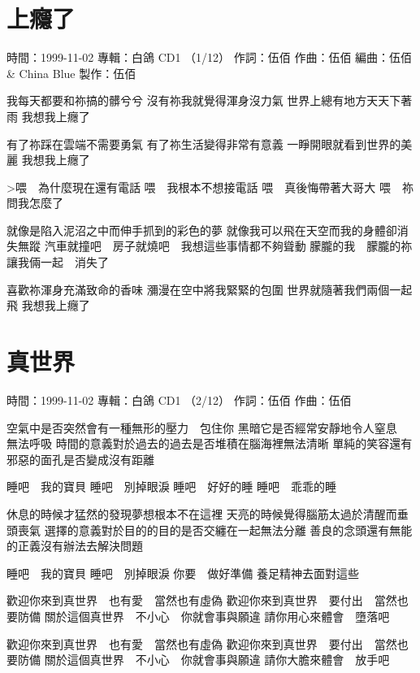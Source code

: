 \documentclass[UTF8,a4paper,oneside,twocolumn,12pt]{ctexbook}
\newcommand{\infopair}[2]{\textbullet #1：#2}
\newcommand{\zc}[1][伍佰]{\infopair{作詞}{#1}}
\newcommand{\zq}[1][伍佰]{\infopair{作曲}{#1}}
\newcommand{\bq}[1][伍佰]{\infopair{編曲}{#1}}
\newcommand{\zj}[1]{\infopair{專輯}{#1}}
\newcommand{\zz}[1]{\infopair{製作}{#1}}
\newcommand{\sj}[1]{\infopair{時間}{#1}}
\newenvironment{info}{\begin{flushleft}\kaishu
	}
	{\end{flushleft}\normalsize\yahei\par}
\newenvironment{lyric}{
	}
{}
\begin{document}
\section{上癮了}
\begin{info}
	\sj{1999-11-02}
	\zj{白鴿 CD1 （1/12）}
	\zc
	\zq
	\bq[伍佰 \& China Blue]
	\zz{伍佰}

\end{info}
\begin{lyric}
	我每天都要和祢搞的髒兮兮
	沒有祢我就覺得渾身沒力氣
	世界上總有地方天天下著雨
	我想我上癮了

	有了祢踩在雲端不需要勇氣
	有了祢生活變得非常有意義
	一睜開眼就看到世界的美麗
	我想我上癮了

	>喂　為什麼現在還有電話
	喂　我根本不想接電話
	喂　真後悔帶著大哥大
	喂　祢問我怎麼了

	就像是陷入泥沼之中而伸手抓到的彩色的夢
	就像我可以飛在天空而我的身體卻消失無蹤
	汽車就撞吧　房子就燒吧　我想這些事情都不夠聳動
	朦朧的我　朦朧的祢　讓我倆一起　消失了

	喜歡祢渾身充滿致命的香味
	瀰漫在空中將我緊緊的包圍
	世界就隨著我們兩個一起飛
	我想我上癮了
\end{lyric}

\section{真世界}
\begin{info}
	\sj{1999-11-02}
	\zj{白鴿 CD1 （2/12）}
	\zc
	\zq
\end{info}
\begin{lyric}
	空氣中是否突然會有一種無形的壓力　包住你
	黑暗它是否經常安靜地令人窒息　無法呼吸
	時間的意義對於過去的過去是否堆積在腦海裡無法清晰
	單純的笑容還有邪惡的面孔是否變成沒有距離

	睡吧　我的寶貝
	睡吧　別掉眼淚
	睡吧　好好的睡
	睡吧　乖乖的睡

	休息的時候才猛然的發現夢想根本不在這裡
	天亮的時候覺得腦筋太過於清醒而垂頭喪氣
	選擇的意義對於目的的目的是否交纏在一起無法分離
	善良的念頭還有無能的正義沒有辦法去解決問題

	睡吧　我的寶貝
	睡吧　別掉眼淚
	你要　做好準備
	養足精神去面對這些

	歡迎你來到真世界　也有愛　當然也有虛偽
	歡迎你來到真世界　要付出　當然也要防備
	關於這個真世界　不小心　你就會事與願違
	請你用心來體會　墮落吧

	歡迎你來到真世界　也有愛　當然也有虛偽
	歡迎你來到真世界　要付出　當然也要防備
	關於這個真世界　不小心　你就會事與願違
	請你大膽來體會　放手吧
\end{lyric}
\end{document}
